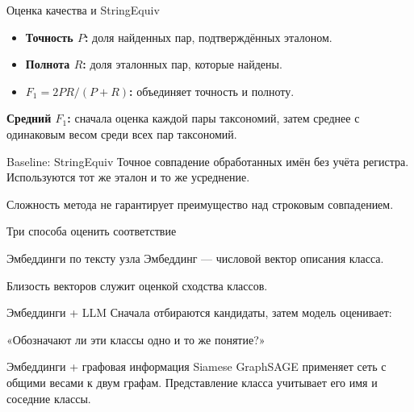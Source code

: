 \documentclass[aspectratio=169,11pt]{beamer}
\begin{document}
\renewcommand{\hseheadertext}{Часть I. Сопоставление таксономий}
\begin{frame}{Оценка качества и StringEquiv}
  \begin{itemize}
    \item \textbf{Точность $P$:} доля найденных пар, подтверждённых эталоном.
    \item \textbf{Полнота $R$:} доля эталонных пар, которые найдены.
    \item \textbf{$F_1=2PR/(P+R)$:} объединяет точность и полноту.
  \end{itemize}
  \textbf{Средний $F_1$:} сначала оценка каждой пары таксономий,
  затем среднее с одинаковым весом среди всех пар таксономий.
  \begin{block}{Baseline: StringEquiv}
    Точное совпадение обработанных имён без учёта регистра.
    Используются тот же эталон и то же усреднение.
  \end{block}
  \alert{Сложность метода не гарантирует преимущество над строковым совпадением.}
\end{frame}

\renewcommand{\hseheadertext}{Часть I. Сопоставление таксономий}
\begin{frame}{Три способа оценить соответствие}
  \begin{block}{Эмбеддинги по тексту узла}
    Эмбеддинг --- числовой вектор описания класса.\par
    Близость векторов служит оценкой сходства классов.
  \end{block}
  \begin{block}{Эмбеддинги + LLM}
    Сначала отбираются кандидаты, затем модель оценивает:\par
    «Обозначают ли эти классы одно и то же понятие?»
  \end{block}
  \begin{block}{Эмбеддинги + графовая информация}
    Siamese GraphSAGE применяет сеть с общими весами к двум графам.
    Представление класса учитывает его имя и соседние классы.
  \end{block}
\end{frame}
\end{document}
